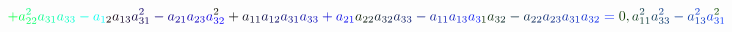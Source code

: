 \documentclass[12pt]{article}
\begin{document}
\begin{displaymath}
\mathcolor[RGB]{0,255,60}{+} \mathcolor[RGB]{0,255,75}{a} _ { \mathcolor[RGB]{0,255,90}{2} \mathcolor[RGB]{0,255,105}{2} } ^ { \mathcolor[RGB]{0,255,120}{2} } \mathcolor[RGB]{0,255,135}{a} _ { \mathcolor[RGB]{0,255,150}{3} \mathcolor[RGB]{0,255,165}{1} } \mathcolor[RGB]{0,255,180}{a} _ { \mathcolor[RGB]{0,255,195}{3} \mathcolor[RGB]{0,255,210}{3} } \mathcolor[RGB]{0,255,225}{-} \mathcolor[RGB]{0,255,240}{a} _ { \mathcolor[RGB]{0,255,255}{1} \mathcolor[RGB]{15,0,0}{2} } \mathcolor[RGB]{15,0,15}{a} _ { \mathcolor[RGB]{15,0,30}{1} \mathcolor[RGB]{15,0,45}{3} } \mathcolor[RGB]{15,0,60}{a} _ { \mathcolor[RGB]{15,0,75}{3} \mathcolor[RGB]{15,0,90}{1} } ^ { \mathcolor[RGB]{15,0,105}{2} } \mathcolor[RGB]{15,0,120}{-} \mathcolor[RGB]{15,0,135}{a} _ { \mathcolor[RGB]{15,0,150}{2} \mathcolor[RGB]{15,0,165}{1} } \mathcolor[RGB]{15,0,180}{a} _ { \mathcolor[RGB]{15,0,195}{2} \mathcolor[RGB]{15,0,210}{3} } \mathcolor[RGB]{15,0,225}{a} _ { \mathcolor[RGB]{15,0,240}{3} \mathcolor[RGB]{15,0,255}{2} } ^ { \mathcolor[RGB]{15,15,0}{2} } \mathcolor[RGB]{15,15,15}{+} \mathcolor[RGB]{15,15,30}{a} _ { \mathcolor[RGB]{15,15,45}{1} \mathcolor[RGB]{15,15,60}{1} } \mathcolor[RGB]{15,15,75}{a} _ { \mathcolor[RGB]{15,15,90}{1} \mathcolor[RGB]{15,15,105}{2} } \mathcolor[RGB]{15,15,120}{a} _ { \mathcolor[RGB]{15,15,135}{3} \mathcolor[RGB]{15,15,150}{1} } \mathcolor[RGB]{15,15,165}{a} _ { \mathcolor[RGB]{15,15,180}{3} \mathcolor[RGB]{15,15,195}{3} } \mathcolor[RGB]{15,15,210}{+} \mathcolor[RGB]{15,15,225}{a} _ { \mathcolor[RGB]{15,15,240}{2} \mathcolor[RGB]{15,15,255}{1} } \mathcolor[RGB]{15,30,0}{a} _ { \mathcolor[RGB]{15,30,15}{2} \mathcolor[RGB]{15,30,30}{2} } \mathcolor[RGB]{15,30,45}{a} _ { \mathcolor[RGB]{15,30,60}{3} \mathcolor[RGB]{15,30,75}{2} } \mathcolor[RGB]{15,30,90}{a} _ { \mathcolor[RGB]{15,30,105}{3} \mathcolor[RGB]{15,30,120}{3} } \mathcolor[RGB]{15,30,135}{-} \mathcolor[RGB]{15,30,150}{a} _ { \mathcolor[RGB]{15,30,165}{1} \mathcolor[RGB]{15,30,180}{1} } \mathcolor[RGB]{15,30,195}{a} _ { \mathcolor[RGB]{15,30,210}{1} \mathcolor[RGB]{15,30,225}{3} } \mathcolor[RGB]{15,30,240}{a} _ { \mathcolor[RGB]{15,30,255}{3} \mathcolor[RGB]{15,45,0}{1} } \mathcolor[RGB]{15,45,15}{a} _ { \mathcolor[RGB]{15,45,30}{3} \mathcolor[RGB]{15,45,45}{2} } \mathcolor[RGB]{15,45,60}{-} \mathcolor[RGB]{15,45,75}{a} _ { \mathcolor[RGB]{15,45,90}{2} \mathcolor[RGB]{15,45,105}{2} } \mathcolor[RGB]{15,45,120}{a} _ { \mathcolor[RGB]{15,45,135}{2} \mathcolor[RGB]{15,45,150}{3} } \mathcolor[RGB]{15,45,165}{a} _ { \mathcolor[RGB]{15,45,180}{3} \mathcolor[RGB]{15,45,195}{1} } \mathcolor[RGB]{15,45,210}{a} _ { \mathcolor[RGB]{15,45,225}{3} \mathcolor[RGB]{15,45,240}{2} } \mathcolor[RGB]{15,45,255}{=} \mathcolor[RGB]{15,60,0}{0} \mathcolor[RGB]{15,60,15}{,} \mathcolor[RGB]{15,60,30}{a} _ { \mathcolor[RGB]{15,60,45}{1} \mathcolor[RGB]{15,60,60}{1} } ^ { \mathcolor[RGB]{15,60,75}{2} } \mathcolor[RGB]{15,60,90}{a} _ { \mathcolor[RGB]{15,60,105}{3} \mathcolor[RGB]{15,60,120}{3} } ^ { \mathcolor[RGB]{15,60,135}{2} } \mathcolor[RGB]{15,60,150}{-} \mathcolor[RGB]{15,60,165}{a} _ { \mathcolor[RGB]{15,60,180}{1} \mathcolor[RGB]{15,60,195}{3} } ^ { \mathcolor[RGB]{15,60,210}{2} } \mathcolor[RGB]{15,60,225}{a} _ { \mathcolor[RGB]{15,60,240}{3} \mathcolor[RGB]{15,60,255}{1} } ^ { \mathcolor[RGB]{15,75,0}{2} } 
\end{displaymath}
\end{document}
